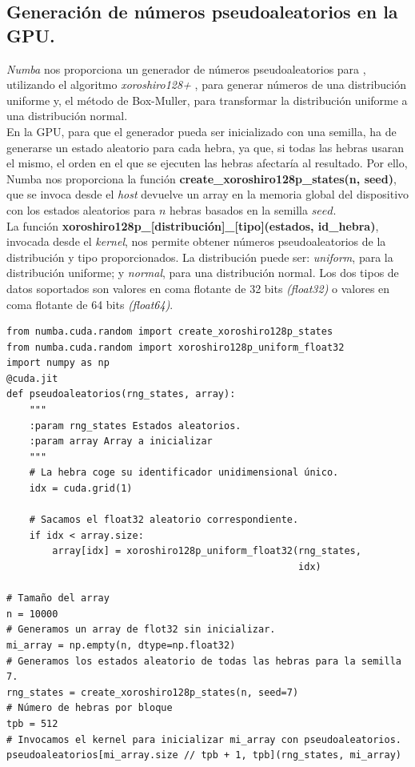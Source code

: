 \subsection{Generación de números pseudoaleatorios en la GPU.}

\textit{Numba} nos proporciona un generador de números pseudoaleatorios para \cudanospace, utilizando el algoritmo \textit{xoroshiro128+} \cite{xoroshiro}, para generar números de una distribución uniforme y, el método de Box-Muller, para transformar la distribución uniforme a una distribución normal.\\

En la GPU, para que el generador pueda ser inicializado con una semilla, ha de generarse un estado aleatorio para cada hebra, ya que, si todas las hebras usaran el mismo, el orden en el que se ejecuten las hebras afectaría al resultado. Por ello, Numba nos proporciona la función \textbf{create\_xoroshiro128p\_states(n, seed)}, que se invoca desde el \textit{host} devuelve un array en la memoria global del dispositivo con los estados aleatorios para $n$ hebras basados en la semilla $seed$.\\

La función \textbf{xoroshiro128p\_[distribución]\_[tipo](estados, id\_hebra)}, invocada desde el \textit{kernel}, nos permite obtener números pseudoaleatorios de la distribución y tipo proporcionados. La distribución puede ser: \textit{uniform}, para la distribución uniforme; y \textit{normal}, para una distribución normal. Los dos tipos de datos soportados son valores en coma flotante de 32 bits \textit{(float32)} o valores en coma flotante de 64 bits \textit{(float64)}. \\

\begin{code}
\begin{verbatim}
from numba.cuda.random import create_xoroshiro128p_states
from numba.cuda.random import xoroshiro128p_uniform_float32
import numpy as np
@cuda.jit
def pseudoaleatorios(rng_states, array):
    """
    :param rng_states Estados aleatorios.
    :param array Array a inicializar
    """
    # La hebra coge su identificador unidimensional único.
    idx = cuda.grid(1)

    # Sacamos el float32 aleatorio correspondiente.
    if idx < array.size:
        array[idx] = xoroshiro128p_uniform_float32(rng_states,
                                                   idx)

# Tamaño del array
n = 10000
# Generamos un array de flot32 sin inicializar.
mi_array = np.empty(n, dtype=np.float32)
# Generamos los estados aleatorio de todas las hebras para la semilla 7.
rng_states = create_xoroshiro128p_states(n, seed=7)
# Número de hebras por bloque
tpb = 512
# Invocamos el kernel para inicializar mi_array con pseudoaleatorios.
pseudoaleatorios[mi_array.size // tpb + 1, tpb](rng_states, mi_array)
\end{verbatim}
\label{code:randoms}
\end{code}

